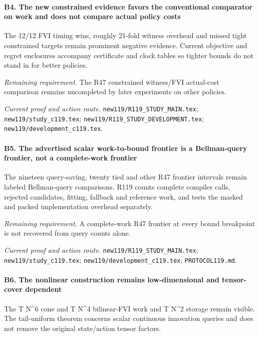 \paragraph{B4. The new constrained evidence favors the conventional comparator on work and does not compare actual policy costs}

The 12/12 FVI timing wins, roughly 21-fold witness overhead and missed tight constrained targets remain prominent negative evidence. Current objective and regret enclosures accompany certificate and clock tables so tighter bounds do not stand in for better policies.

\par\emph{Remaining requirement.} The R47 constrained witness/\allowbreak{}FVI actual-cost comparison remains uncompleted by later experiments on other policies.

\par\emph{Current proof and action route.} \nolinkurl{new119/R119_STUDY_MAIN.tex}; \nolinkurl{new119/study_c119.tex}; \nolinkurl{new119/R119_STUDY_DEVELOPMENT.tex}; \nolinkurl{new119/development_c119.tex}.

\paragraph{B5. The advertised scalar work-to-bound frontier is a Bellman-query frontier, not a complete-work frontier}

The nineteen query-saving, twenty tied and other R47 frontier intervals remain labeled Bellman-query comparisons. R119 counts complete compiler calls, rejected candidates, fitting, fallback and reference work, and tests the masked and packed implementation overhead separately.

\par\emph{Remaining requirement.} A complete-work R47 frontier at every bound breakpoint is not recovered from query counts alone.

\par\emph{Current proof and action route.} \nolinkurl{new119/R119_STUDY_MAIN.tex}; \nolinkurl{new119/study_c119.tex}; \nolinkurl{new119/development_c119.tex}; \nolinkurl{PROTOCOL119.md}.

\paragraph{B6. The nonlinear construction remains low-dimensional and tensor-cover dependent}

The T N\textasciicircum{}6 cone and T N\textasciicircum{}4 bilinear-FVI work and T N\textasciicircum{}2 storage remain visible. The tail-uniform theorem concerns scalar continuous innovation queries and does not remove the original state/\allowbreak{}action tensor factors.

